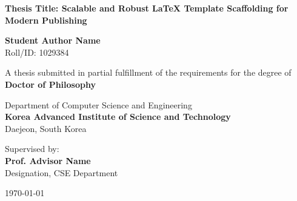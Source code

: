 \begin{titlepage}
\begin{center}
    \vspace*{1cm}
    
    
    \vspace{1.5cm}
    
    {\huge \bfseries \color{primary} Thesis Title: Scalable and Robust LaTeX Template Scaffolding for Modern Publishing}
    
    \vspace{1.5cm}
    
    {\Large \bfseries Student Author Name} \\
    \vspace{0.2cm}
    {Roll/ID: 1029384}
    
    \vspace{1.5cm}
    
    {A thesis submitted in partial fulfillment of the requirements for the degree of} \\
    \vspace{0.3cm}
    {\large \bfseries \color{secondary} Doctor of Philosophy}
    
    \vspace{1.5cm}
    
    {\large Department of Computer Science and Engineering} \\
    \vspace{0.2cm}
    {\large \bfseries \color{primary} Korea Advanced Institute of Science and Technology} \\
    \vspace{0.1cm}
    {Daejeon, South Korea}
    
    \vfill
    
    {Supervised by:} \\
    {\large \bfseries Prof. Advisor Name} \\
    {Designation, CSE Department}
    
    \vspace{1cm}
    
    {\large \today}
    
\end{center}
\end{titlepage}
